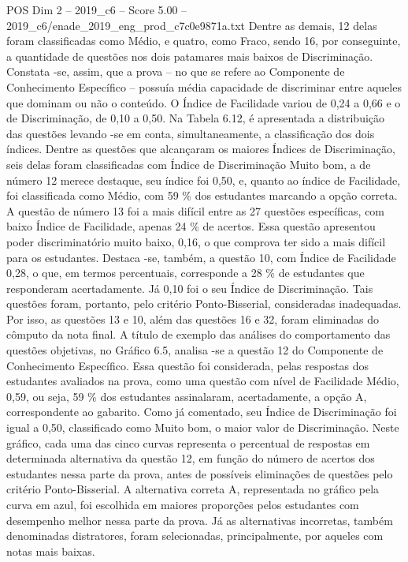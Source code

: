 \begin{textsample}{POS Dim 2 – 2019\_c6 – Score 5.00 – 2019\_c6/enade\_2019\_eng\_prod\_c7c0e9871a.txt}
Dentre as demais, 12 delas foram classificadas como Médio, e quatro, como Fraco, sendo 16, por conseguinte, a quantidade de questões nos dois patamares mais baixos de Discriminação.
Constata -se, assim, que a prova – no que se refere ao Componente de Conhecimento Específico – possuía média capacidade de discriminar entre aqueles que dominam ou não o conteúdo.
O Índice de Facilidade variou de 0,24 a 0,66 e o de Discriminação, de 0,10 a 0,50.
Na Tabela 6.12, é apresentada a distribuição das questões levando -se em conta, simultaneamente, a classificação dos dois índices.
Dentre as questões que alcançaram os maiores Índices de Discriminação, seis delas foram classificadas com Índice de Discriminação Muito bom, a de número 12 merece destaque, seu índice foi 0,50, e, quanto ao índice de Facilidade, foi classificada como Médio, com 59 \% dos estudantes marcando a opção correta.
A questão de número 13 foi a mais difícil entre as 27 questões específicas, com baixo Índice de Facilidade, apenas 24 \% de acertos.
Essa questão apresentou poder discriminatório muito baixo, 0,16, o que comprova ter sido a mais difícil para os estudantes.
Destaca -se, também, a questão 10, com Índice de Facilidade 0,28, o que, em termos percentuais, corresponde a 28 \% de estudantes que responderam acertadamente.
Já 0,10 foi o seu Índice de Discriminação.
Tais questões foram, portanto, pelo critério Ponto-Bisserial, consideradas inadequadas.
Por isso, as questões 13 e 10, além das questões 16 e 32, foram eliminadas do cômputo da nota final.
A título de exemplo das análises do comportamento das questões objetivas, no Gráfico 6.5, analisa -se a questão 12 do Componente de Conhecimento Específico.
Essa questão foi considerada, pelas respostas dos estudantes avaliados na prova, como uma questão com nível de Facilidade Médio, 0,59, ou seja, 59 \% dos estudantes assinalaram, acertadamente, a opção A, correspondente ao gabarito.
Como já comentado, seu Índice de Discriminação foi igual a 0,50, classificado como Muito bom, o maior valor de Discriminação.
Neste gráfico, cada uma das cinco curvas representa o percentual de respostas em determinada alternativa da questão 12, em função do número de acertos dos estudantes nessa parte da prova, antes de possíveis eliminações de questões pelo critério Ponto-Bisserial.
A alternativa correta A, representada no gráfico pela curva em azul, foi escolhida em maiores proporções pelos estudantes com desempenho melhor nessa parte da prova.
Já as alternativas incorretas, também denominadas distratores, foram selecionadas, principalmente, por aqueles com notas mais baixas.

\end{textsample}

